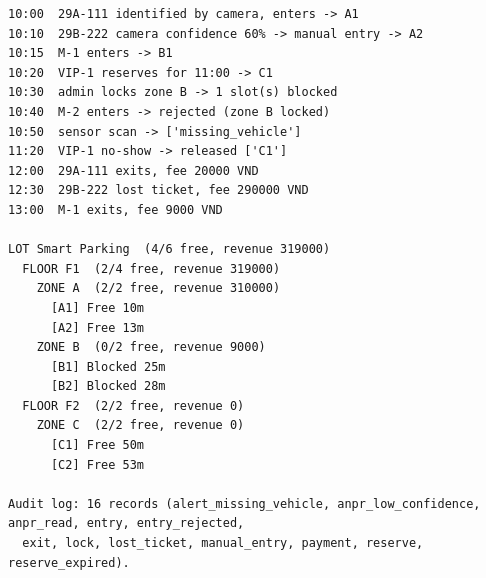 \begin{Verbatim}[fontsize=\scriptsize,frame=single]
10:00  29A-111 identified by camera, enters -> A1
10:10  29B-222 camera confidence 60% -> manual entry -> A2
10:15  M-1 enters -> B1
10:20  VIP-1 reserves for 11:00 -> C1
10:30  admin locks zone B -> 1 slot(s) blocked
10:40  M-2 enters -> rejected (zone B locked)
10:50  sensor scan -> ['missing_vehicle']
11:20  VIP-1 no-show -> released ['C1']
12:00  29A-111 exits, fee 20000 VND
12:30  29B-222 lost ticket, fee 290000 VND
13:00  M-1 exits, fee 9000 VND

LOT Smart Parking  (4/6 free, revenue 319000)
  FLOOR F1  (2/4 free, revenue 319000)
    ZONE A  (2/2 free, revenue 310000)
      [A1] Free 10m
      [A2] Free 13m
    ZONE B  (0/2 free, revenue 9000)
      [B1] Blocked 25m
      [B2] Blocked 28m
  FLOOR F2  (2/2 free, revenue 0)
    ZONE C  (2/2 free, revenue 0)
      [C1] Free 50m
      [C2] Free 53m

Audit log: 16 records (alert_missing_vehicle, anpr_low_confidence, anpr_read, entry, entry_rejected,
  exit, lock, lost_ticket, manual_entry, payment, reserve, reserve_expired).
\end{Verbatim}
